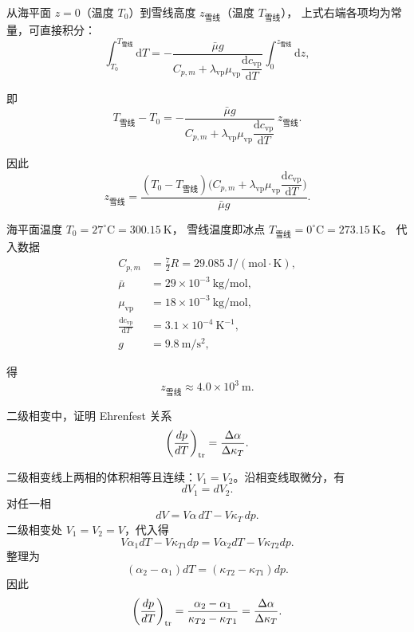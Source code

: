 \begin{question}
\begin{solution}
从海平面 $z=0$（温度 $T_0$）到雪线高度 $z_{\text{雪线}}$（温度 $T_{\text{雪线}}$），
上式右端各项均为常量，可直接积分：
\[
\int_{T_0}^{T_{\text{雪线}}} \mathrm{d}T
= -\frac{\bar\mu g}
{C_{p,m} + \lambda_{\mathrm{vp}}\mu_{\mathrm{vp}}
\dfrac{\mathrm{d}c_{\mathrm{vp}}}{\mathrm{d}T}}
\int_0^{z_{\text{雪线}}} \mathrm{d}z,
\]

即
\[
T_{\text{雪线}} - T_0
= -\frac{\bar\mu g}
{C_{p,m} + \lambda_{\mathrm{vp}}\mu_{\mathrm{vp}}
\dfrac{\mathrm{d}c_{\mathrm{vp}}}{\mathrm{d}T}}
\,z_{\text{雪线}}.
\]

因此
\[
z_{\text{雪线}}
= \frac{(T_0 - T_{\text{雪线}})
\bigl(
C_{p,m} + \lambda_{\mathrm{vp}}\mu_{\mathrm{vp}}
\dfrac{\mathrm{d}c_{\mathrm{vp}}}{\mathrm{d}T}
\bigr)}
{\bar\mu g}.
\]

海平面温度 $T_0 = 27^\circ\mathrm{C} = 300.15\ \mathrm{K}$，
雪线温度即冰点 $T_{\text{雪线}} = 0^\circ\mathrm{C} = 273.15\ \mathrm{K}$。
代入数据
\[
\begin{aligned}
C_{p,m} &= \frac{7}{2}R = 29.085\ \mathrm{J/(mol\cdot K)},\\[2pt]
\bar\mu &= 29\times10^{-3}\ \mathrm{kg/mol},\\[2pt]
\mu_{\mathrm{vp}} &= 18\times10^{-3}\ \mathrm{kg/mol},\\[2pt]
\frac{\mathrm{d}c_{\mathrm{vp}}}{\mathrm{d}T}
        &= 3.1\times10^{-4}\ \mathrm{K^{-1}},\\[2pt]
g &= 9.8\ \mathrm{m/s^2},
\end{aligned}
\]

得
\[
z_{\text{雪线}} \approx 4.0\times10^3\ \mathrm{m}.
\]
\end{solution}
\end{question}


\begin{question}
二级相变中，证明 Ehrenfest 关系
\[
\left(\frac{dp}{dT}\right)_{\rm tr}=\frac{\Delta\alpha}{\Delta\kappa_T}.
\]
\begin{solution}
二级相变线上两相的体积相等且连续：$V_1=V_2$。沿相变线取微分，有
\[
dV_1=dV_2.
\]
对任一相
\[
dV=V\alpha\,dT-V\kappa_T\,dp.
\]
二级相变处 $V_1=V_2=V$，代入得
\[
V\alpha_1dT-V\kappa_{T1}dp
=V\alpha_2dT-V\kappa_{T2}dp.
\]
整理为
\[
(\alpha_2-\alpha_1)dT=(\kappa_{T2}-\kappa_{T1})dp.
\]
因此
\[
\left(\frac{dp}{dT}\right)_{\rm tr}
=\frac{\alpha_2-\alpha_1}{\kappa_{T2}-\kappa_{T1}}
=\frac{\Delta\alpha}{\Delta\kappa_T}.
\]
\end{solution}
\end{question}

